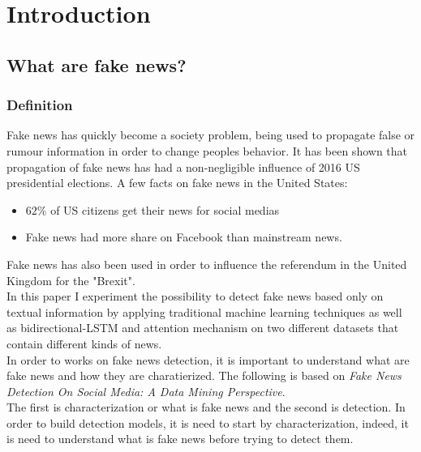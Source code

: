 \chapter{Introduction} \label{section:intro}
\section{What are fake news?}
\subsection{Definition}
Fake news has quickly become a society problem, being used to propagate false or rumour information in order to change peoples behavior. It has been shown that propagation of fake news has had a non-negligible influence of 2016 US presidential elections\cite{Allcott2017}. A few facts on fake news in the United States: 

\begin{itemize}
 \item $62\%$ of US citizens get their news for social medias\cite{gottfried2016news}
 \item Fake news had more share on Facebook than mainstream news\cite{silverman2016teens}.
\end{itemize}

Fake news has also been used in order to influence the referendum in the United Kingdom for the "Brexit". \\

In this paper I experiment the possibility to detect fake news based only on textual information by applying traditional machine learning techniques\cite{Fan2008LIBLINEARAL,Robertson2004,zhang_optimality_nodate} as well as bidirectional-LSTM\cite{Hochreiter1997LongSM} and attention mechanism\cite{zhou-etal-2016-attention} on two different datasets that contain different kinds of news.\\

In order to works on fake news detection, it is important to understand what are fake news and how they are charatierized. The following is based on \textit{Fake News Detection On Social Media: A Data Mining Perspective}\cite{shu2017fake}.\\

The first is characterization or what is fake news and the second is detection. In order to build detection models, it is need to start by characterization, indeed, it is need to understand what is fake news before trying to detect them. \\

